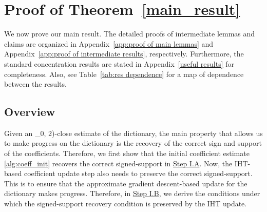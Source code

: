 \documentclass{article}
\def\[#1\]{{$#1$}}
\begin{document}
 























































\vspace*{-5pt}
\section{Proof of Theorem~\ref{main_result}}\label{app:pf_main}
We now prove our main result. The detailed proofs of intermediate lemmas and claims are organized in Appendix~\ref{app:proof of main lemmas} and Appendix~\ref{app:proof of intermediate results}, respectively. Furthermore, the standard concentration results are stated in Appendix~\ref{useful results} for completeness. Also, see Table~\ref{tab:res dependence} for a map of dependence between the results.


\subsection*{Overview}
Given an \[(\epsilon_0, 2)\]-close estimate of the dictionary, the main property that allows us to make progress on the dictionary is the recovery of the correct sign and support of the coefficients. Therefore, we first show that the initial coefficient estimate \eqref{alg:coeff_init} recovers the correct signed-support in \hyperref[Step I.A]{Step I.A}. Now, the IHT-based coefficient update step also needs to preserve the correct signed-support. This is to ensure that the approximate gradient descent-based update for the dictionary makes progress. Therefore, in \hyperref[Step I.B]{Step I.B}, we derive the conditions under which the signed-support recovery condition is preserved by the IHT update. 
\end{document}
